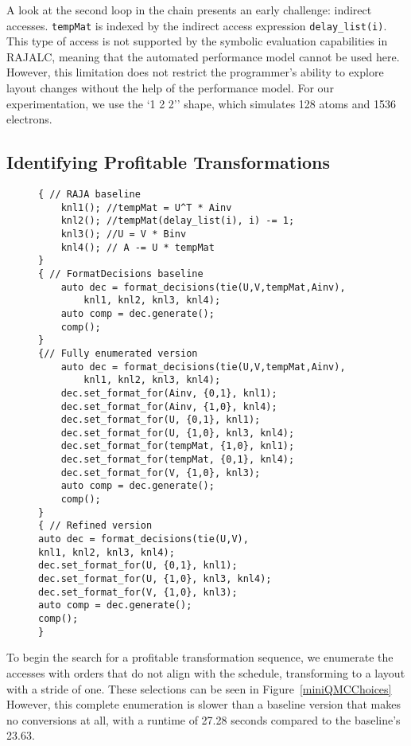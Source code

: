 A look at the second loop in the chain presents an early challenge: indirect accesses. 
\verb.tempMat. is indexed by the indirect access expression \verb.delay_list(i).. 
This type of access is not supported by the symbolic evaluation capabilities in RAJALC, meaning that the automated performance model cannot be used here.
However, this limitation does not restrict the programmer's ability to explore layout changes without the help of the performance model. 
For our experimentation, we use the `1 2 2'' shape, which simulates 128 atoms and 1536 electrons.

\subsection{Identifying Profitable Transformations}
\begin{figure}
\begin{lstlisting}[caption={Different layout transformations selected as part of the miniQMC exploration.}, label={miniQMCChoices}]
{ // RAJA baseline
	knl1(); //tempMat = U^T * Ainv
	knl2(); //tempMat(delay_list(i), i) -= 1;
	knl3(); //U = V * Binv
	knl4(); // A -= U * tempMat
}
{ // FormatDecisions baseline
	auto dec = format_decisions(tie(U,V,tempMat,Ainv), 
		knl1, knl2, knl3, knl4);
	auto comp = dec.generate();
	comp();
}
{// Fully enumerated version
	auto dec = format_decisions(tie(U,V,tempMat,Ainv), 
		knl1, knl2, knl3, knl4);
	dec.set_format_for(Ainv, {0,1}, knl1);
	dec.set_format_for(Ainv, {1,0}, knl4);
	dec.set_format_for(U, {0,1}, knl1);
	dec.set_format_for(U, {1,0}, knl3, knl4);
	dec.set_format_for(tempMat, {1,0}, knl1);
	dec.set_format_for(tempMat, {0,1}, knl4);
	dec.set_format_for(V, {1,0}, knl3);
	auto comp = dec.generate();
	comp();
}
{ // Refined version
auto dec = format_decisions(tie(U,V), 
knl1, knl2, knl3, knl4);
dec.set_format_for(U, {0,1}, knl1);
dec.set_format_for(U, {1,0}, knl3, knl4);
dec.set_format_for(V, {1,0}, knl3);
auto comp = dec.generate();
comp();
}
\end{lstlisting}
\end{figure}

To begin the search for a profitable transformation sequence, we enumerate the accesses with orders that do not align with the schedule, transforming to a layout with a stride of one.
These selections can be seen in Figure~\ref{miniQMCChoices}
However, this complete enumeration is slower than a baseline \FormatDecisions{} version that makes no conversions at all, with a runtime of 27.28 seconds compared to the baseline's 23.63.

